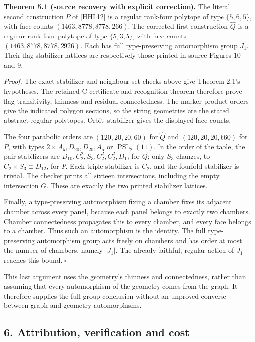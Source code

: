 \documentclass[
  11pt,
  a4paper,
]{article}
\begin{document}
\textbf{Theorem 5.1 (source recovery with explicit correction).} The
literal second construction \(P\) of {[}HHL12{]} is a regular rank-four
polytope of type \(\{5,6,5\}\), with face counts
\((1463,8778,8778,266)\). The corrected first construction
\(\widehat Q\) is a regular rank-four polytope of type \(\{5,3,5\}\),
with face counts \((1463,8778,8778,2926)\). Each has full
type-preserving automorphism group \(J_1\). Their flag stabilizer
lattices are respectively those printed in source Figures 10 and 9.

\emph{Proof.} The exact stabilizer and neighbour-set checks above give
Theorem 2.1's hypotheses. The retained C certificate and recognition
theorem therefore prove flag transitivity, thinness and residual
connectedness. The marker product orders give the indicated polygon
sections, so the string geometries are the stated abstract regular
polytopes. Orbit--stabilizer gives the displayed face counts.

The four parabolic orders are \((120,20,20,60)\) for \(\widehat Q\) and
\((120,20,20,660)\) for \(P\), with types
\(2\times A_5,D_{20},D_{20},A_5\) or \(\operatorname{PSL}_2(11)\). In
the order of the table, the pair stabilizers are
\(D_{10},C_2^2,S_3,C_2^2,C_2^2,D_{10}\) for \(\widehat Q\); only \(S_3\)
changes, to \(C_2\times S_3\cong D_{12}\), for \(P\). Each triple
stabilizer is \(C_2\), and the fourfold stabilizer is trivial. The
checker prints all sixteen intersections, including the empty
intersection \(G\). These are exactly the two printed stabilizer
lattices.

Finally, a type-preserving automorphism fixing a chamber fixes its
adjacent chamber across every panel, because each panel belongs to
exactly two chambers. Chamber connectedness propagates this to every
chamber, and every face belongs to a chamber. Thus such an automorphism
is the identity. The full type-preserving automorphism group acts freely
on chambers and has order at most the number of chambers, namely
\(|J_1|\). The already faithful, regular action of \(J_1\) reaches this
bound. \(\square\)

This last argument uses the geometry's thinness and connectedness,
rather than assuming that every automorphism of the geometry comes from
the graph. It therefore supplies the full-group conclusion without an
unproved converse between graph and geometry automorphisms.

\subsection{6. Attribution, verification and
cost}\label{attribution-verification-and-cost}
\end{document}
